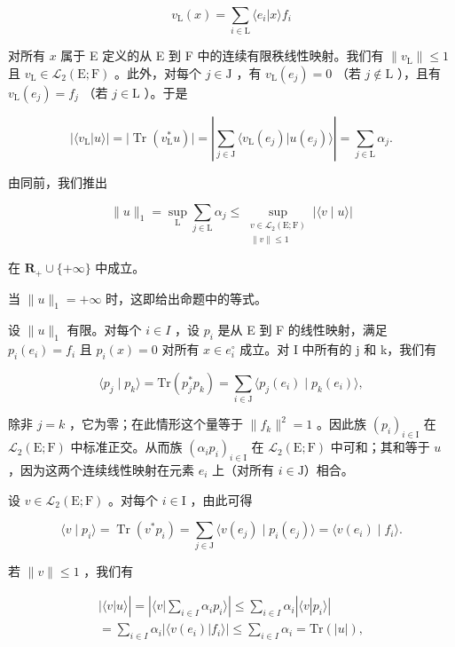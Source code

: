 \[
v _ {\mathrm{L}} (x) = \sum_ {i \in \mathrm{L}} \langle e _ {i} | x \rangle f _ {i}
\]

对所有 \(x\) 属于 E 定义的从 E 到 F 中的连续有限秩线性映射。我们有 \(\| v_{\mathrm{L}}\| \leqslant 1\) 且 \(v_{\mathrm{L}}\in \mathcal{L}_{2}(\mathrm{E};\mathrm{F})\) 。此外，对每个 \(j\in \mathrm{J}\) ，有 \(v_{\mathrm{L}}(e_j) = 0\) （若 \(j\notin \mathrm{L}\) ），且有 \(v_{\mathrm{L}}(e_j) = f_j\) （若 \(j\in \mathrm{L}\) ）。于是

\[
| \langle v _ {\mathrm{L}} | u \rangle | = | \operatorname{Tr} (v _ {\mathrm{L}} ^ {*} u) | = \left| \sum_ {j \in \mathrm{J}} \langle v _ {\mathrm{L}} (e _ {j}) | u (e _ {j}) \rangle \right| = \sum_ {j \in \mathrm{L}} \alpha_ {j}.
\]

由同前，我们推出

\[
\| u\|_{1} = \sup_{\text{L}}\sum_{j\in \text{L}}\alpha_{j}\leqslant \sup_{\substack{v\in \mathcal{L}_{2}(\text{E};\text{F})\\ \| v\| \leqslant 1}}|\langle v\mid u\rangle |\tag{10}
\]

在 \(\mathbf{R}_{+}\cup\{+\infty\}\) 中成立。

当 \(\|u\|_{1}=+\infty\) 时，这即给出命题中的等式。

设 \(\|u\|_{1}\) 有限。对每个 \(i \in I\) ，设 \(p_{i}\) 是从 E 到 F 的线性映射，满足 \(p_{i}(e_{i}) = f_{i}\) 且 \(p_{i}(x) = 0\) 对所有 \(x \in e_{i}^{\circ}\) 成立。对 I 中所有的 j 和 k，我们有

\[
\langle p _ {j} \mid p _ {k} \rangle = \mathrm{Tr} (p _ {j} ^ {*} p _ {k}) = \sum_ {i \in \mathrm{J}} \langle p _ {j} (e _ {i}) \mid p _ {k} (e _ {i}) \rangle ,
\]

除非 \(j = k\) ，它为零；在此情形这个量等于 \(\| f_k\|^2 = 1\) 。因此族 \((p_i)_{i \in \mathrm{I}}\) 在 \(\mathcal{L}_2(\mathrm{E};\mathrm{F})\) 中标准正交。从而族 \((\alpha_i p_i)_{i \in \mathrm{I}}\) 在 \(\mathcal{L}_2(\mathrm{E};\mathrm{F})\) 中可和；其和等于 \(u\) ，因为这两个连续线性映射在元素 \(e_i\) 上（对所有 \(i \in \mathrm{J}\)）相合。

设 \(v \in \mathcal{L}_2(\mathrm{E};\mathrm{F})\) 。对每个 \(i \in \mathrm{I}\) ，由此可得

\[
\langle v \mid p _ {i} \rangle = \operatorname{Tr} (v ^ {*} p _ {i}) = \sum_ {j \in \mathrm{J}} \langle v (e _ {j}) \mid p _ {i} (e _ {j}) \rangle = \langle v (e _ {i}) \mid f _ {i} \rangle .
\]

若 \(\|v\| \leqslant 1\) ，我们有

\[
\begin{array}{c} | \langle v | u \rangle | = \left| \langle v | \sum_ {i \in I} \alpha_ {i} p _ {i} \rangle \right| \leqslant \sum_ {i \in I} \alpha_ {i} | \langle v | p _ {i} \rangle | \\ = \sum_ {i \in I} \alpha_ {i} | \langle v (e _ {i}) | f _ {i} \rangle | \leqslant \sum_ {i \in I} \alpha_ {i} = \mathrm{Tr} (| u |), \end{array}
\]

